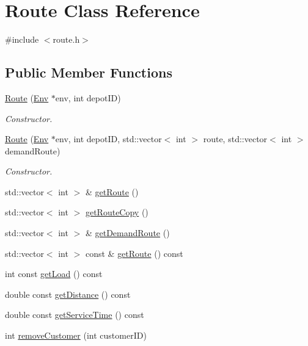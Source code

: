 \hypertarget{class_route}{}\section{Route Class Reference}
\label{class_route}


{\ttfamily \#include $<$route.\+h$>$}

\subsection*{Public Member Functions}
\begin{DoxyCompactItemize}
\item 
\hyperlink{class_route_a7b0add29f3255cd109649ca25db20d8d}{Route} (\hyperlink{class_env}{Env} $\ast$env, int depot\+ID)
\begin{DoxyCompactList}\small\item\em Constructor. \end{DoxyCompactList}\item 
\hyperlink{class_route_a95a55c89846e5e183b1749a8507275d5}{Route} (\hyperlink{class_env}{Env} $\ast$env, int depot\+ID, std\+::vector$<$ int $>$ route, std\+::vector$<$ int $>$ demand\+Route)
\begin{DoxyCompactList}\small\item\em Constructor. \end{DoxyCompactList}\item 
std\+::vector$<$ int $>$ \& \hyperlink{class_route_a9a12c02d891924f0050d3d6bc7af1e18}{get\+Route} ()
\item 
std\+::vector$<$ int $>$ \hyperlink{class_route_adbff1ea9d40933cbb79886efd758ef0c}{get\+Route\+Copy} ()
\item 
std\+::vector$<$ int $>$ \& \hyperlink{class_route_a3c342e45335d32de6f7019e4cc8ff5ca}{get\+Demand\+Route} ()
\item 
std\+::vector$<$ int $>$ const  \& \hyperlink{class_route_a151bbafcfc1afd47bda7c2b6c6567c1e}{get\+Route} () const
\item 
int const \hyperlink{class_route_abdde0209de6671eac1fabd237804ff19}{get\+Load} () const
\item 
double const \hyperlink{class_route_a5326c0234e1ed102bf9f8cf8236de8bd}{get\+Distance} () const
\item 
double const \hyperlink{class_route_ae30f973f4cb746802cf54d9f1827445f}{get\+Service\+Time} () const
\item 
int \hyperlink{class_route_a3e52680923dc08fe57d7a622cf8ad17b}{remove\+Customer} (int customer\+ID)

\end{DoxyCompactItemize}
